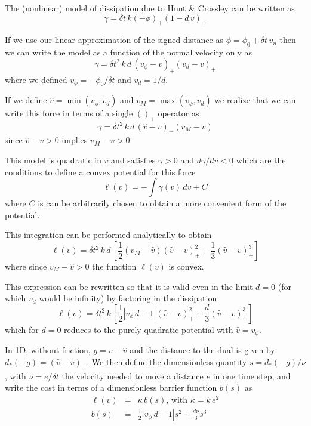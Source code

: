 The (nonlinear) model of dissipation due to Hunt \& Crossley
\cite{bib:hunt_crossley} can be written as 
\begin{equation}
    \gamma = \delta t\,k(-\phi)_+(1-d\,v)_+
\end{equation}

If we use our linear approximation of the signed distance as $\phi=\phi_0+\delta
t\,v_n$ then we can write the model as a function of the normal velocity only as
\begin{equation}
    \gamma = \delta t^2\,k\,d\,(v_\phi-v)_+(v_d-v)_+
\end{equation}
where we defined $v_\phi=-\phi_0/\delta t$ and $v_d=1/d$.

If we define $\hat{v}=\min(v_\phi, v_d)$ and $v_M=\max(v_\phi, v_d)$ we realize
that we can write this force in terms of a single $()_+$ operator as
\begin{equation}
    \gamma = \delta t^2\,k\,d\,(\hat{v}-v)_+(v_M-v)
\end{equation}
since $\hat{v}-v > 0$ implies $v_M-v > 0$.

This model is quadratic in $v$ and satisfies $\gamma > 0$ and $d\gamma/dv < 0$
which are the conditions to define a convex potential for this force
\begin{equation}
    \ell(v) = -\int \gamma(v)\,dv + C
\end{equation}
where $C$ is can be arbitrarily chosen to obtain a more convenient form of the
potential.

This integration can be performed analytically to obtain
\begin{equation}
    \ell(v) = \delta t^2\,k\,d\,\left[ \frac{1}{2}(v_M-\hat{v})(\hat{v}-v)_+^2 + \frac{1}{3}(\hat{v}-v)_+^3 \right]
\end{equation}
where since $v_M-\hat{v} > 0$ the function $\ell(v)$ is convex.

This expression can be rewritten so that it is valid even in the limit $d=0$
(for which $v_d$ would be infinity) by factoring in the dissipation
\begin{equation}
    \ell(v) = \delta t^2\,k\,\left[ \frac{1}{2}|v_\phi\,d-1|(\hat{v}-v)_+^2 + \frac{d}{3}(\hat{v}-v)_+^3 \right]
\end{equation}
which for $d=0$ reduces to the purely quadratic potential with $\hat{v}=v_\phi$.

In 1D, without friction, $g=v-\hat{v}$ and the distance to the dual is given by
$d_*(-g) = (\hat{v}-v)_+$. We then define the dimensionless quantity
$s=d_*(-g)/\nu$, with $\nu=e/\delta t$ the velocity needed to move a distance
$e$ in one time step, and write the cost in terms of a dimensionless barrier
function $b(s)$ as
\begin{eqnarray}
    \ell(v) &=& \kappa\,b(s)\text{, with } \kappa = k\,e^2\\
    b(s) &=& \frac{1}{2}|v_\phi\,d-1|s^2 + \frac{d\nu}{3}s^3
\end{eqnarray}


